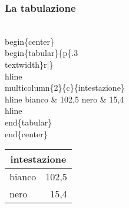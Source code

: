 \documentclass[svgnames,%
	ucs,%
	pdftex]{guitbeamer}
\begin{document}
\begin{frame}
  \frametitle{La tabulazione}
	\begin{LaTeXcode}
		\alert{\\begin\{center\}}\n
		\\begin\{tabular\}\{p\{.3\\textwidth\}r|\}\
		\\hline \n
		\\multicolumn\{2\}\{c\}\{intestazione\}\bs\bs \
		\\hline \n
		\hspace*{5ex}bianco \& 102,5 \bs\bs\n
		\hspace*{5ex}nero   \& 15,4 \bs\bs\
		\\hline\n
		\\end\{tabular\}\n
		\alert{\\end\{center\}}
	\end{LaTeXcode}
	\begin{LaTeXoutput}
	  \begin{center}
		\begin{tabular}{p{}r}\hline
		\multicolumn{2}{c}{intestazione}\\\hline
		bianco & 102,5 \\
		nero   & 15,4 \\\hline
		\end{tabular}
	  \end{center}
	\end{LaTeXoutput}
\end{frame}
\end{document}
